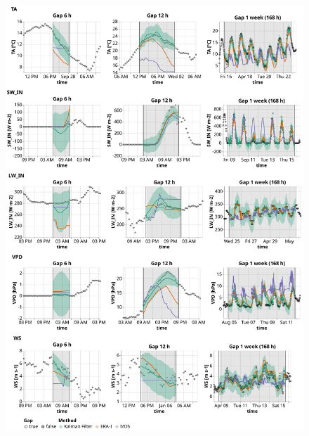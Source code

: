 \documentclass{article}
\newcommand{\imgwidth}{6in}
\begin{document}
\begin{figure}
\centerline{\includegraphics[width=\imgwidth]{timeseries_1}}
\caption{}
\label{fig:ts_1-1}
\end{figure}
\restoregeometry
\end{document}
